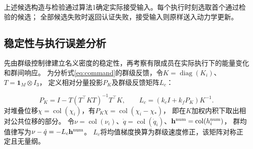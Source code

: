 \documentclass[UTF8,a4paper,11pt,fontset=none]{ctexart}
\newcommand{\diag}{\operatorname{diag}}\newcommand{\col}{\operatorname{col}}
\begin{document}
上述候选构造与检验通过算法1确定实际接受输入。每个执行时刻选取首个通过检验的候选；
全部候选失败时返回认证失败，接受输入则原样送入动力学更新。


\begin{center}\end{center}

\subsection{稳定性与执行误差分析}\label{sec:nominal-properties}\label{sec:execution-errors}\label{sec:formation-response}
先由群级控制律建立名义密度的稳定性，再考察有限成员在实际执行下的能量变化和群间响应。
为分析式\eqref{eq:command}的群级反馈，令$K=\diag(K_i)$、$T=\mathbf1_M\otimes I_3$，
定义相对分量投影$P_K$及群级反馈矩阵$L_c$：

\begin{equation}
P_K=I-T(T^\top KT)^{-1}T^\top K,\qquad
L_c=(k_cI+k_fP_K)K^{-1}.
\label{eq:mobility}
\end{equation}
对堆叠位移$\chi=\col(\chi_i)$，有$P_K\chi=\col(\chi_i-\chi_*)$，
即在$K$加权内积下取出相对公共位移的部分。
令$\nu=\col(\nu_i)$、$\dot q=\col(\dot q_i)$、$\mathbf h^{\rm num}=\col(h_i^{\rm num})$，
群均值律写为$\nu-\dot q=-L_c\mathbf h^{\rm num}$。
$L_c$将均值梯度换算为群级速度修正，该矩阵对称正定且无量纲。
\end{document}
